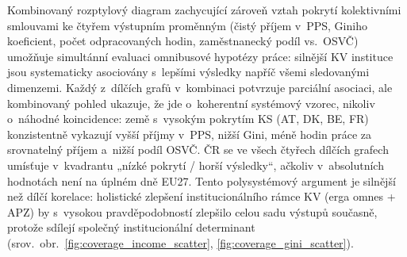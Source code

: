 Kombinovaný rozptylový diagram zachycující zároveň vztah pokrytí kolektivními smlouvami ke čtyřem výstupním proměnným (čistý příjem v~\ac{PPS}, Giniho koeficient, počet odpracovaných hodin, zaměstnanecký podíl vs.~\ac{OSVČ}) umožňuje simultánní evaluaci omnibusové hypotézy práce: silnější \ac{KV} instituce jsou systematicky asociovány s~lepšími výsledky napříč všemi sledovanými dimenzemi.
Každý z~dílčích grafů v~kombinaci potvrzuje parciální asociaci, ale kombinovaný pohled ukazuje, že jde o~koherentní systémový vzorec, nikoliv o~náhodné koincidence: země s~vysokým pokrytím \ac{KS} (AT, DK, BE, FR) konzistentně vykazují vyšší příjmy v~\ac{PPS}, nižší Gini, méně hodin práce za srovnatelný příjem a~nižší podíl \ac{OSVČ}.
ČR se ve všech čtyřech dílčích grafech umísťuje v~kvadrantu „nízké pokrytí / horší výsledky“, ačkoliv v~absolutních hodnotách není na úplném dně EU27.
Tento polysystémový argument je silnější než dílčí korelace: holistické zlepšení institucionálního rámce \ac{KV} (erga omnes + \ac{APZ}) by s~vysokou pravděpodobností zlepšilo celou sadu výstupů současně, protože sdílejí společný institucionální determinant (srov.~obr.~\ref{fig:coverage_income_scatter}, \ref{fig:coverage_gini_scatter}).


